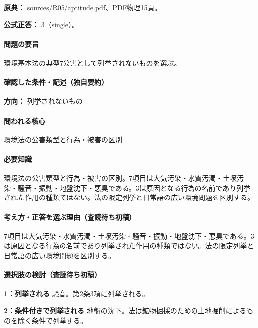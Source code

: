 \noindent\textbf{原典：} sources/R05/aptitude.pdf、PDF物理15頁。

\textbf{公式正答：} 3（single）。

\paragraph{問題の要旨} 環境基本法の典型7公害として列挙されないものを選ぶ。

\paragraph{確認した条件・記述（独自要約）}\mbox{}\par

\noindent\textbf{方向：} 列挙されないもの\par

\paragraph{問われる核心} 環境法の公害類型と行為・被害の区別

\paragraph{必要知識} 環境法の公害類型と行為・被害の区別。7項目は大気汚染・水質汚濁・土壌汚染・騒音・振動・地盤沈下・悪臭である。3は原因となる行為の名前であり列挙された作用の種類ではない。法の限定列挙と日常語の広い環境問題を区別する。

\paragraph{考え方・正答を選ぶ理由（査読待ち初稿）} 7項目は大気汚染・水質汚濁・土壌汚染・騒音・振動・地盤沈下・悪臭である。3は原因となる行為の名前であり列挙された作用の種類ではない。法の限定列挙と日常語の広い環境問題を区別する。

\paragraph{選択肢の検討（査読待ち初稿）}\mbox{}\par

\noindent\textbf{1：列挙される} 騒音。第2条3項に列挙される。\par

\noindent\textbf{2：条件付きで列挙される} 地盤の沈下。法は鉱物掘採のための土地掘削によるものを除く条件で列挙する。\par


